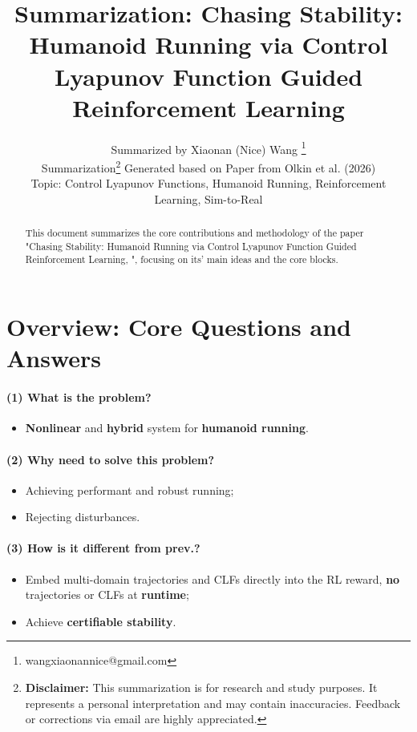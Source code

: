 \documentclass{article}
\title{Summarization: Chasing Stability: Humanoid Running via Control Lyapunov Function Guided Reinforcement Learning}
\author{
  Summarized by Xiaonan (Nice) Wang \thanks{wangxiaonannice@gmail.com} \\
  Summarization\thanks{\textbf{Disclaimer:} This summarization is for research and study purposes. It represents a personal interpretation and may contain inaccuracies. Feedback or corrections via email are highly appreciated.} Generated based on Paper from  Olkin et al. (2026) \\
  Topic: Control Lyapunov Functions, Humanoid Running, Reinforcement Learning, Sim-to-Real \\
}
\begin{document}
\maketitle

\begin{abstract}
This document summarizes the core contributions and methodology of the paper "Chasing Stability: Humanoid Running via Control Lyapunov Function Guided Reinforcement Learning, \cite{olkin2025chasing}", focusing on its' main ideas and the core blocks.
\end{abstract}

\section{Overview: Core Questions and Answers}
                           
\paragraph{(1) What is the problem?} 
\begin{itemize}
  \item \textbf{Nonlinear} and \textbf{hybrid} system for \textbf{humanoid running}.
\end{itemize}

\paragraph{(2) Why need to solve this problem?}
\begin{itemize}
  \item Achieving performant and robust running;
  \item Rejecting disturbances.
\end{itemize}

\paragraph{(3) How is it different from prev.?}
\begin{itemize}
  \item Embed multi-domain trajectories and CLFs directly into the RL reward, \textbf{no} trajectories or CLFs at \textbf{runtime};
  \item Achieve \textbf{certifiable stability}.
\end{itemize}
\end{document}
